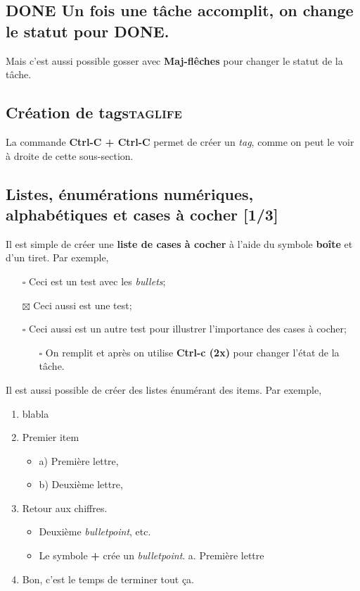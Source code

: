 \documentclass{article}
\numberwithin{equation}{section}
\begin{document}
\subsection{{\bfseries\sffamily DONE} Un fois une tâche accomplit, on change le statut pour \textbf{DONE}.}
\label{sec:org695fcfe}
Mais c'est aussi possible gosser avec \textbf{Maj-flêches} pour changer le statut
de la tâche.

\subsection{Création de tags\hfill{}\textsc{taglife}}
\label{sec:org2794dbb}
La commande \textbf{Ctrl-C + Ctrl-C} permet de créer un \emph{tag}, comme on peut le voir à droite de cette sous-section.

\subsection{Listes, énumérations numériques, alphabétiques et cases à cocher [1/3]}
\label{sec:orgaa6b01c}
Il est simple de créer une \textbf{liste de cases à cocher} à l'aide du symbole \textbf{boîte} et d'un tiret.
Par exemple,
\begin{itemize}
\item[{$\square$}] Ceci est un test avec les \emph{bullets};
\item[{$\boxtimes$}] Ceci aussi est une test;
\item[{$\square$}] Ceci aussi est un autre test pour illustrer l'importance des cases à cocher;
\begin{itemize}
\item[{$\square$}] On remplit et après on utilise \textbf{Ctrl-c (2x)} pour changer l'état de la tâche.
\end{itemize}
\end{itemize}

Il est aussi possible de créer des listes énumérant des items.
Par exemple,
\begin{enumerate}
\item blabla
\item Premier item
\begin{itemize}
\item a) Première lettre,
\item b) Deuxième lettre,
\end{itemize}
\item Retour aux chiffres. 
\begin{itemize}
\item Deuxième \emph{bulletpoint}, etc.
\item Le symbole \textbf{+} crée un \emph{bulletpoint}.
a. Première lettre
\end{itemize}
\item Bon, c'est le temps de terminer tout ça.
\end{enumerate}
\end{document}

